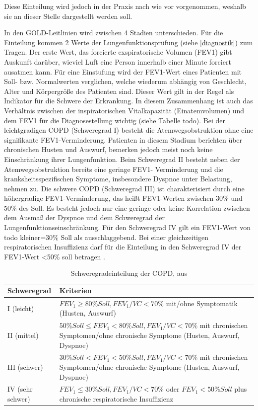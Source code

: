 Diese Einteilung wird jedoch in der Praxis nach wie vor vorgenommen, weshalb sie an dieser Stelle dargestellt werden soll.

In den GOLD-Leitlinien wird zwischen 4 Stadien unterschieden. Für die Einteilung kommen 2 Werte der Lungenfunktionsprüfung (siehe \ref{diagnostik}) zum Tragen. Der erste Wert, das forcierte exspiratorische Volumen (FEV1) gibt Auskunft darüber, wieviel Luft eine Person innerhalb einer Minute forciert ausatmen kann. Für eine Einstufung wird der FEV1-Wert eines Patienten mit Soll- bzw. Normalwerten verglichen, welche wiederum abhängig von Geschlecht, Alter und Körpergröße des Patienten sind. Dieser Wert gilt in der Regel als Indikator für die Schwere der Erkrankung. In diesem Zusammenhang ist auch das Verhältnis zwischen der inspiratorischen Vitalkapazität (Einatemvolumen) und dem FEV1 für die Diagnosestellung wichtig (siehe Tabelle todo). Bei der leichtgradigen COPD (Schweregrad I) besteht die Atemwegsobstruktion ohne eine signifikante FEV1-Verminderung. Patienten in diesem Stadium berichten über chronischen Husten und Auswurf, bemerken jedoch meist noch keine Einschränkung ihrer Lungenfunktion. Beim Schweregrad II besteht neben der Atemwegsobstruktion bereits eine geringe FEV1- Verminderung und die kranksheitsspezifischen Symptome, insbesondere Dyspnoe unter Belastung, nehmen zu. Die schwere COPD (Schweregrad III) ist charakterisiert durch eine höhergradige FEV1-Verminderung, das heißt FEV1-Werten zwischen 30\% und 50\% des Soll. Es besteht jedoch nur eine geringe oder keine Korrelation zwischen dem Ausmaß der Dyspnoe und dem Schweregrad der Lungenfunktionseinschränkung. Für den Schweregrad IV gilt ein FEV1-Wert von todo kleiner=30\% Soll als ausschlaggebend. Bei einer gleichzeitigen respiratorischen Insuffizienz darf für die Einteilung in den Schweregrad IV der FEV1-Wert <50\% soll betragen \autocite[vgl.][e8]{vogelmeier2007}.

\begin{table}
\centering
\begin{tabular}{lp{10cm}}
	\textbf{Schweregrad} & \textbf{Kriterien} \\
	\hline \hline
	I (leicht) & $FEV_{1} \ge 80\% Soll, FEV_{1}/VC < 70\%$ \newline mit/ohne Symptomatik (Husten, Auswurf) \\
	\hline
	II (mittel) & $50\% Soll \le FEV_{1} < 80\% Soll, FEV_{1}/VC < 70\%$ \newline mit chronischen Symptomen/ohne chronische Symptome (Husten, Auswurf, Dyspnoe) \\
	\hline
	III (schwer) & $30\% Soll < FEV_{1} < 50\% Soll, FEV_{1}/VC < 70\%$ \newline mit chronischen Symptomen/ohne chronische Symptome (Husten, Auswurf, Dyspnoe) \\
	\hline
	IV (sehr schwer) & $FEV_{1} \le 30\% Soll, FEV_{1}/VC < 70\%$ oder \newline $FEV_{1} < 50\% Soll$ plus chronische respiratorische Insuffizienz \\
	\hline
\end{tabular}
\caption{Schweregradeinteilung der COPD, aus \autocite[e9]{vogelmeier2007}}
\label{tab:copd_schweregrade}
\end{table}

